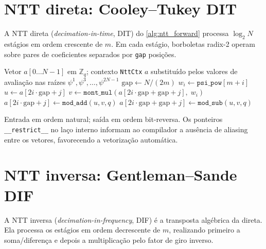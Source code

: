 \documentclass[11pt,a4paper]{report}
\begin{document}
\section{NTT direta: Cooley--Tukey DIT}
\label{sec:ntt_forward}

A NTT direta (\emph{decimation-in-time}, DIT) do \cref{alg:ntt_forward} processa
$\log_2 N$ estágios em ordem crescente de $m$. Em cada estágio, borboletas radix-2
operam sobre pares de coeficientes separados por \texttt{gap} posições.

\begin{algorithm}[ht]
\caption{\texttt{ntt\_forward}: NTT negacíclica direta (Cooley--Tukey DIT)}
\label{alg:ntt_forward}
\begin{algorithmic}[1]
\Require Vetor $a[0\ldots N-1]$ em $\mathbb{Z}_q$;\; contexto \texttt{NttCtx}
\Ensure $a$ substituído pelos valores de avaliação nas raízes $\psi^1, \psi^3, \ldots, \psi^{2N-1}$
  \State $\text{gap} \gets N / (2m)$
    \State $w_i \gets \texttt{psi\_pow}[m + i]$
      \State $u \gets a[2i \cdot \text{gap} + j]$
      \State $v \gets \texttt{mont\_mul}(a[2i \cdot \text{gap} + \text{gap} + j],\; w_i)$
      \State $a[2i \cdot \text{gap} + j]            \gets \texttt{mod\_add}(u, v, q)$
      \State $a[2i \cdot \text{gap} + \text{gap} + j] \gets \texttt{mod\_sub}(u, v, q)$
    \EndFor
  \EndFor
\EndFor
\end{algorithmic}
\end{algorithm}

Entrada em ordem natural; saída em ordem bit-reversa. Os ponteiros \texttt{\_\_restrict\_\_}
no laço interno informam ao compilador a ausência de aliasing entre os vetores, favorecendo
a vetorização automática.

\section{NTT inversa: Gentleman--Sande DIF}
\label{sec:ntt_inverse}

A NTT inversa (\emph{decimation-in-frequency}, DIF) é a transposta algébrica da direta.
Ela processa os estágios em ordem decrescente de $m$, realizando primeiro a soma/diferença
e depois a multiplicação pelo fator de giro inverso.
\end{document}

